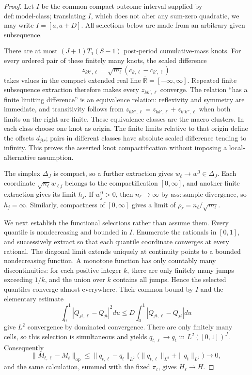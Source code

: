 \documentclass{article}
\begin{document}
\begin{proof}
Let \(I\) be the common compact outcome interval supplied by \(\mathrm{def:model\mbox{-}class}\); translating \(I\), which does not alter any sum-zero quadratic, we may write \(I=[a,a+D]\).  All selections below are made from an arbitrary given subsequence.

There are at most \((J+1)T_1(S-1)\) post-period cumulative-mass knots.  For every ordered pair of these finitely many knots, the scaled difference
\[
 z_{kk',\ell}=\sqrt{m_\ell}(c_{k,\ell}-c_{k',\ell})
\]
takes values in the compact extended real line \(\overline{\mathbb R}=[-\infty,\infty]\).  Repeated finite subsequence extraction therefore makes every \(z_{kk',\ell}\) converge.  The relation ``has a finite limiting difference'' is an equivalence relation: reflexivity and symmetry are immediate, and transitivity follows from
\(z_{kk'',\ell}=z_{kk',\ell}+z_{k'k'',\ell}\) when both limits on the right are finite.  These equivalence classes are the macro clusters.  In each class choose one knot as origin.  The finite limits relative to that origin define the offsets \(d_{jtr}\); pairs in different classes have absolute scaled difference tending to infinity.  This proves the asserted knot compactification without imposing a local-alternative assumption.

The simplex \(\Delta_J\) is compact, so a further extraction gives \(w_\ell\to w^0\in\Delta_J\).  Each coordinate \(\sqrt{n_\ell}w_{\ell j}\) belongs to the compactification \([0,\infty]\), and another finite extraction gives its limit \(h_j\).  If \(w_j^0>0\), then \(n_\ell\to\infty\) by \(\mathrm{ass:sample\mbox{-}divergence}\), so \(h_j=\infty\).  Similarly, compactness of \([0,\infty]\) gives a limit of \(\rho_\ell=n_\ell/\sqrt{m_\ell}\).

We next establish the functional selections rather than assume them.  Every quantile is nondecreasing and bounded in \(I\).  Enumerate the rationals in \([0,1]\), and successively extract so that each quantile coordinate converges at every rational.  The diagonal limit extends uniquely at continuity points to a bounded nondecreasing function.  A monotone function has only countably many discontinuities: for each positive integer \(k\), there are only finitely many jumps exceeding \(1/k\), and the union over \(k\) contains all jumps.  Hence the selected quantiles converge almost everywhere.  Their common bound by \(I\) and the elementary estimate
\[
 \int_0^1|Q_{jt,\ell}-Q_{jt}|^2du
 \leq D\int_0^1|Q_{jt,\ell}-Q_{jt}|du
\]
give \(L^2\) convergence by dominated convergence.  There are only finitely many cells, so this selection is simultaneous and yields \(q_{t,\ell}\to q_t\) in \(L^2([0,1])^J\).  Consequently
\[
 \|M_{t,\ell}-M_t\|_{\mathrm{op}}
 \leq \|q_{t,\ell}-q_t\|_{L^2}
       \bigl(\|q_{t,\ell}\|_{L^2}+\|q_t\|_{L^2}\bigr)
 \longrightarrow0,
\]
and the same calculation, summed with the fixed \(\pi_t\), gives \(H_\ell\to H\).


\end{proof}
\end{document}
